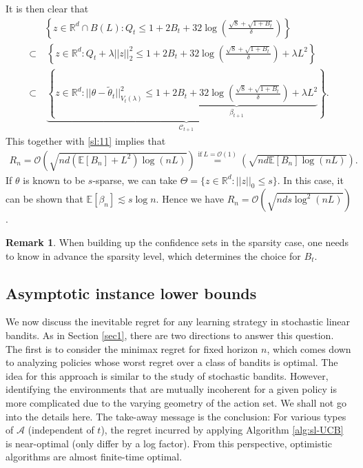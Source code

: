 \documentclass[10pt,a4article]{amsart}
\numberwithin{equation}{section}
\theoremstyle{plain}
\theoremstyle{definition}
\newtheorem{Rem}[Th]{Remark}
\def\R{{\mathbb R}}
\def\E{{\mathbb E}}
\def\R{{\mathbb R}}
\def\t{{\theta}}
\begin{document}
It is then clear that 
\begin{align*}
&\left\{z\in\R^d\cap B(L): Q_t\leq 1+2B_t+32\log\left(\frac{\sqrt{8}+\sqrt{1+B_t}}{\delta}\right) \right\}\\
\subset&\ \left\{z\in\R^d: Q_t +\lambda ||z||_2^2\leq 1+2B_t+32\log\left(\frac{\sqrt{8}+\sqrt{1+B_t}}{\delta}\right) +\lambda L^2\right\}\\
\subset&\ \underbrace{\left\{z\in\R^d: ||\t-\tilde\t_t||^2_{V_t(\lambda)}\leq \underbrace{1+2B_t+32\log\left(\frac{\sqrt{8}+\sqrt{1+B_t}}{\delta}\right)+\lambda L^2}_{\beta_{t+1}} \right\}}_{\mathcal C_{t+1}}. 
\end{align*}
This together with \eqref{sl:11} implies that 
\begin{align*}
R_n = \mathcal O \left(\sqrt{nd(\E[B_n]+L^2)\log(nL)}\right)\stackrel{\text{if}\ L=\mathcal O(1)}{=}\left(\sqrt{nd\E[B_n]\log(nL)}\right).
\end{align*}
If $\t$ is known to be $s$-sparse, we can take $\Theta = \{z\in\R^d: ||z||_0\leq s\}$. In this case, it can be shown that $\E[\beta_n] \lesssim s\log n$. Hence we have $R_n = \mathcal O \left(\sqrt{nds\log^2(nL)}\right)$.
\begin{Rem}
When building up the confidence sets in the sparsity case, one needs to know in advance the sparsity level, which determines the choice for $B_t$. 
\end{Rem} 

\subsection{Asymptotic instance lower bounds}
We now discuss the inevitable regret for any learning strategy in stochastic linear bandits. As in Section \ref{sec1}, there are two directions to answer this question.  The first is to consider the minimax regret for fixed horizon $n$, which comes down to analyzing policies whose worst regret over a class of bandits is optimal. The idea for this approach is similar to the study of stochastic bandits. However, identifying the environments that are mutually incoherent for a given policy is more complicated due to the varying geometry of the action set. We shall not go into the details here. The take-away message is the conclusion: For various types of $\mathcal A$ (independent of $t$), the regret incurred by applying Algorithm \ref{alg:sl-UCB} is near-optimal (only differ by a log factor). From this perspective, optimistic algorithms are almost finite-time optimal. 
\end{document}
